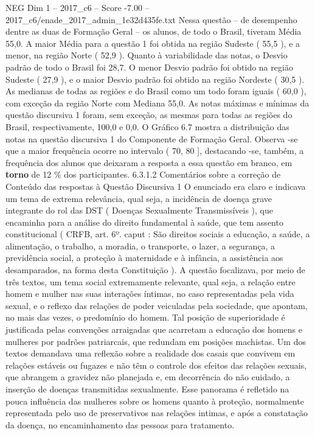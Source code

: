 \begin{textsample}{NEG Dim 1 – 2017\_c6 – Score -7.00 – 2017\_c6/enade\_2017\_admin\_1e32d435fe.txt}
Nessa questão – de desempenho dentre as duas de Formação Geral – os alunos, de todo o Brasil, tiveram Média 55,0.
A maior Média para a questão 1 foi obtida na região Sudeste ( 55,5 ), e a menor, na região Norte ( 52,9 ).
Quanto à variabilidade das notas, o Desvio padrão de todo o Brasil foi 28,7.
O menor Desvio padrão foi obtido na região Sudeste ( 27,9 ), e o maior Desvio padrão foi obtido na região Nordeste ( 30,5 ).
As medianas de todas as regiões e do Brasil como um todo foram iguais ( 60,0 ), com exceção da região Norte com Mediana 55,0.
As notas máximas e mínimas da questão discursiva 1 foram, sem exceção, as mesmas para todas as regiões do Brasil, respectivamente, 100,0 e 0,0.
O Gráfico 6.7 mostra a distribuição das notas na questão discursiva 1 do Componente de Formação Geral.
Observa -se que a maior frequência ocorre no intervalo ( 70, 80 ], destacando -se, também, a frequência dos alunos que deixaram a resposta a essa questão em branco, em \textbf{torno} de 12 \% dos participantes. 6.3.1.2 Comentários sobre a correção de Conteúdo das respostas à Questão Discursiva 1 O enunciado era claro e indicava um tema de extrema relevância, qual seja, a incidência de doença grave integrante do rol das DST ( Doenças Sexualmente Transmissíveis ), que encaminha para a análise do direito fundamental à saúde, que tem assento constitucional ( CRFB, art. 6º. caput : São direitos sociais a educação, a saúde, a alimentação, o trabalho, a moradia, o transporte, o lazer, a segurança, a previdência social, a proteção à maternidade e à infância, a assistência aos desamparados, na forma desta Constituição ).
A questão focalizava, por meio de três textos, um tema social extremamente relevante, qual seja, a relação entre homem e mulher nas suas interações íntimas, no caso representadas pela vida sexual, e o reflexo das relações de poder veiculadas pela sociedade, que apontam, no mais das vezes, o predomínio do homem.
Tal posição de superioridade é justificada pelas convenções arraigadas que acarretam a educação dos homens e mulheres por padrões patriarcais, que redundam em posições machistas.
Um dos textos demandava uma reflexão sobre a realidade dos casais que convivem em relações estáveis ou fugazes e não têm o controle dos efeitos das relações sexuais, que abrangem a gravidez não planejada e, em decorrência do não cuidado, a inserção de doenças transmitidas sexualmente.
Esse panorama é refletido na pouca influência das mulheres sobre os homens quanto à proteção, normalmente representada pelo uso de preservativos nas relações intimas, e após a constatação da doença, no encaminhamento das pessoas para tratamento.

\end{textsample}
